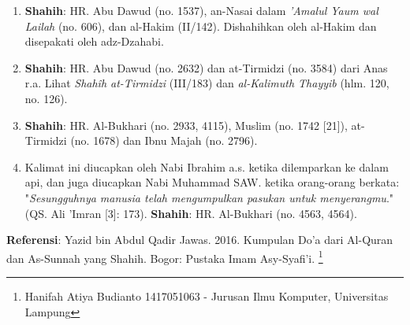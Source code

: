 \documentclass[a4paper,12pt]{article}
\begin{document}
\begin{enumerate}
\item \textbf{Shahih}: HR. Abu Dawud (no. 1537), an-Nasai dalam 
\textit{'Amalul Yaum wal Lailah} (no. 606), dan al-Hakim (II/142). 
Dishahihkan oleh al-Hakim dan disepakati oleh adz-Dzahabi.
\item \textbf{Shahih}: HR. Abu Dawud (no. 2632) dan at-Tirmidzi (no. 3584) 
dari Anas r.a. Lihat \textit{Shah\^{i}h at-Tirmidzi} (III/183) dan 
\textit{al-Kalimuth Thayyib} (hlm. 120, no. 126).     
\item \textbf{Shahih}: HR. Al-Bukhari (no. 2933, 4115), Muslim (no.  1742 
[21]), at-Tirmidzi (no. 1678) dan Ibnu Majah (no. 2796).
\item Kalimat ini diucapkan oleh Nabi Ibrahim a.s. ketika dilemparkan ke 
dalam api, dan juga diucapkan Nabi Muhammad SAW. ketika orang-orang 
berkata: "\textit{Sesungguhnya manusia telah mengumpulkan pasukan untuk 
menyerangmu}." (QS. Ali 'Imran [3]: 173). \textbf{Shahih}: HR. Al-Bukhari 
(no. 4563, 4564).
\end{enumerate}
\textbf{Referensi}: Yazid bin Abdul Qadir Jawas. 2016. Kumpulan Do'a dari
Al-Quran dan As-Sunnah yang Shahih. Bogor: Pustaka Imam Asy-Syafi'i.
\footnote{Hanifah Atiya Budianto 1417051063 - Jurusan Ilmu Komputer,
Universitas Lampung}
\end{document}
